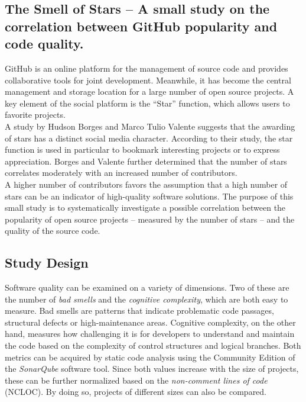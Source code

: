 \documentclass[a4paper, 12pt]{article}
\begin{document}
	
\subsection*{The Smell of Stars -- A small study on the correlation between GitHub popularity and code quality.}

GitHub is an online platform for the management of source code and provides collaborative tools for joint development. Meanwhile, it has become the central management and storage location for a large number of open source projects. A key element of the social platform is the “Star” function, which allows users to favorite projects.\\

A study by Hudson Borges and Marco Tulio Valente\autocite{Borges2018} suggests that the awarding of stars has a distinct social media character. According to their study, the star function is used in particular to bookmark interesting projects or to express appreciation. Borges and Valente further determined that the number of stars correlates moderately with an increased number of contributors.\\

A higher number of contributors favors the assumption that a high number of stars can be an indicator of high-quality software solutions. The purpose of this small study is to systematically investigate a possible correlation between the popularity of open source projects -- measured by the number of stars -- and the quality of the source code.\\
	
\subsection*{Study Design}

Software quality can be examined on a variety of dimensions. Two of these are the number of \textit{bad smells} and the \textit{cognitive complexity}\autocite{Bogner2022}, which are both easy to measure. Bad smells are patterns that indicate problematic code passages, structural defects or high-maintenance areas. Cognitive complexity, on the other hand, measures how challenging it is for developers to understand and maintain the code based on the complexity of control structures and logical branches. Both metrics can be acquired by static code analysis using the Community Edition of the \textit{SonarQube} software tool\autocite{SonarQube}. Since both values increase with the size of projects, these can be further normalized based on the \textit{non-comment lines of code} (NCLOC). By doing so, projects of different sizes can also be compared.\\
\end{document}
